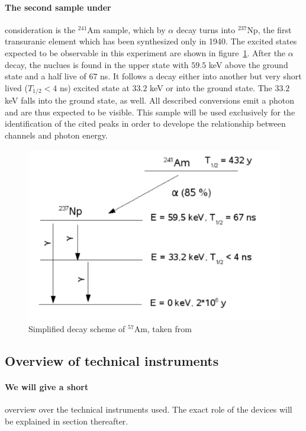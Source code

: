 \paragraph{The second sample under}
consideration is the $^{241}$Am sample, which by $\alpha$ decay turns into $^{237}$Np, the 
first transuranic element which has been synthesized only in 1940. The excited 
states expected to be observable in this experiment are shown in figure~\ref{fig:decay_scheme_Am}. 
After the $\alpha$ decay, the nuclues is found in the upper state with $59.5$ keV 
above the ground state and a half live of $67$ ns. It follows a decay either into another 
but very short lived ($T_{1/2} < 4$ ns) excited state at $33.2$ keV or into the 
ground state. The $33.2$ keV falls into the ground state, as well. All described conversions 
emit a photon and are thus expected to be visible. This sample will be used exclusively for the 
identification of the cited peaks in order to develope the relationship between channels and 
photon energy. 
\begin{figure}
    \begin{centering}
        \includegraphics[width=0.70\linewidth]{figures/decay_scheme_Am}
        \caption{Simplified decay scheme of $^{57}$Am, taken from~\cite{ver}}
        \label{fig:decay_scheme_Am}
    \end{centering}
\end{figure}


\subsection{Overview of technical instruments}
\paragraph{We will give a short}
overview over the technical instruments used. The exact role 
of the devices will be explained in section thereafter.
\label{sub:overview_of_technical_instruments}
